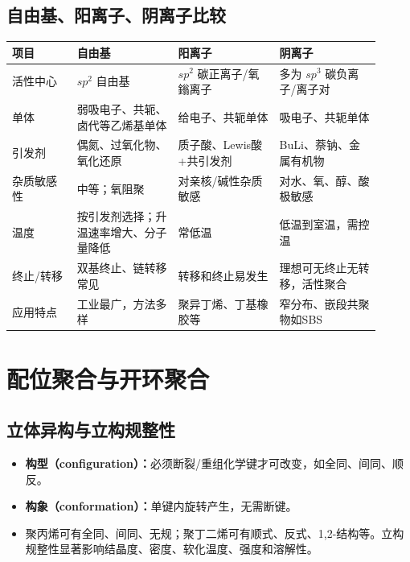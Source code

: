 \documentclass[UTF8,a4paper,10pt,twocolumn]{ctexart}
\begin{document}
\subsection{自由基、阳离子、阴离子比较}
\begin{center}
  \scriptsize
  \begin{tabularx}{\linewidth}{p{0.16\linewidth}p{0.25\linewidth}p{0.25\linewidth}p{0.25\linewidth}}
    \toprule
    项目    & 自由基                 & 阳离子              & 阴离子                \\
    \midrule
    活性中心  & $sp^2$ 自由基          & $sp^2$ 碳正离子/氧鎓离子 & 多为 $sp^3$ 碳负离子/离子对 \\
    单体    & 弱吸电子、共轭、卤代等乙烯基单体    & 给电子、共轭单体         & 吸电子、共轭单体           \\
    引发剂   & 偶氮、过氧化物、氧化还原        & 质子酸、Lewis酸+共引发剂  & BuLi、萘钠、金属有机物      \\
    杂质敏感性 & 中等；氧阻聚              & 对亲核/碱性杂质敏感       & 对水、氧、醇、酸极敏感        \\
    温度    & 按引发剂选择；升温速率增大、分子量降低 & 常低温              & 低温到室温，需控温          \\
    终止/转移 & 双基终止、链转移常见          & 转移和终止易发生         & 理想可无终止无转移，活性聚合     \\
    应用特点  & 工业最广，方法多样           & 聚异丁烯、丁基橡胶等       & 窄分布、嵌段共聚物如SBS      \\
    \bottomrule
  \end{tabularx}
\end{center}

\section{配位聚合与开环聚合}
\subsection{立体异构与立构规整性}
\begin{itemize}
  \item \textbf{构型（configuration）：}必须断裂/重组化学键才可改变，如全同、间同、顺反。
  \item \textbf{构象（conformation）：}单键内旋转产生，无需断键。
  \item 聚丙烯可有全同、间同、无规；聚丁二烯可有顺式、反式、1,2-结构等。立构规整性显著影响结晶度、密度、软化温度、强度和溶解性。
\end{itemize}
\end{document}
